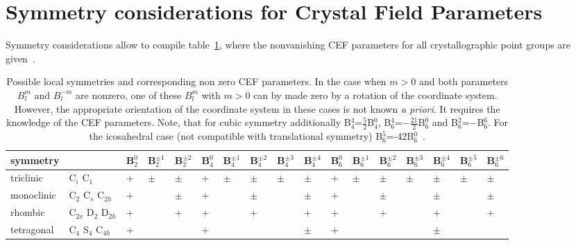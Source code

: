 \section{Symmetry considerations for Crystal Field Parameters}

Symmetry considerations allow to compile 
table~\ref{tab:symmetry}, where the nonvanishing
CEF parameters for all 
crystallographic point groups are
given~\cite{bauer09-183}.

\begin{landscape}

\begin{table}
\caption{Possible local symmetries and corresponding non zero CEF parameters.
  In the case when $m>0$ and both parameters $B_l^m$ and $B_l^{-m}$ are
nonzero, one of these $B_l^m$ with $m>0$
 can by made zero by a rotation of the coordinate system.
However, the appropriate orientation of 
the coordinate system in these cases is not known {\em a priori}. It requires
the knowledge of the CEF parameters.
Note, that for cubic symmetry additionally B$_4^4$=$\frac{5}{2}$B$_4^0$,
B$_6^4$=$-\frac{21}{2}$B$_6^0$ and B$_6^2$=$-$B$_6^6$. For the icosahedral case (not compatible with
translational symmetry) B$_6^5$=-42B$_6^0$~\cite{walter87-2504}.}
\label{tab:symmetry}
\begin{tabular}{lllllllllllllllll}
\hline
symmetry   &                                    &B$_2^0$&B$_2^{\pm 1}$&B$_2^{\pm 2}$&B$_4^0$&B$_4^{\pm 1}$&B$_4^{\pm 2}$&B$_4^{\pm 3}$&B$_4^{\pm 4}$&B$_6^0$&B$_6^{\pm 1}$&B$_6^{\pm 2}$&B$_6^{\pm 3}$&B$_6^{\pm 4}$&B$_6^{\pm 5}$&B$_6^{\pm 6}$\\
\hline
triclinic  & C$_i$ C$_1$                        &+      &$\pm$  &$\pm$&+     &$\pm$  &$\pm$  &$\pm$  &$\pm$  &+      &$\pm$  &$\pm$ &$\pm$&$\pm$  &$\pm$  &$\pm$  \\
monoclinic & C$_2$ C$_s$ C$_{2h}$               &+      &       &$\pm$ &+      &       &$\pm$  &       &$\pm$  &+      &       &$\pm$  & &$\pm$  &       &$\pm$  \\
rhombic    & C$_{2v}$ D$_{2}$ D$_{2h}$          &+      &       &+ &+      &       &+      &       &+      &+      &       &+      & &+      &       &+      \\
tetragonal & C$_{4}$ S$_{4}$ C$_{4h}$           &+      &       & &+      &       &       &       &$\pm$  &+      &       &       & &$\pm$  &       &       \\

\end{tabular}
\end{table}
\end{landscape}
